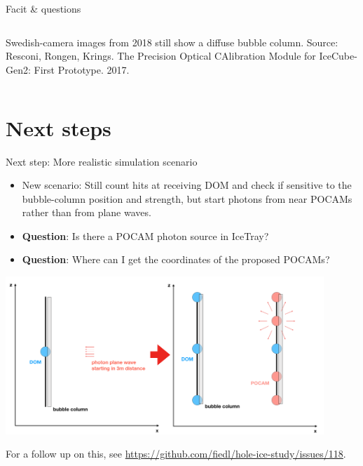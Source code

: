 \begin{frame}[fragile]{Facit \& questions}
\begin{columns}
\begin{column}{0.5\textwidth}
      \vspace*{4mm}
      \tiny Swedish-camera images from 2018 still show a diffuse bubble column. Source: Resconi, Rongen, Krings. The Precision Optical CAlibration Module for IceCube-Gen2: First Prototype. 2017.
    \end{column}
  \end{columns}
\end{frame}

\section{Next steps}
\begin{frame}[fragile]{Next step: More realistic simulation scenario}
  \begin{itemize}
    \item New scenario: Still count hits at receiving DOM and check if sensitive to the bubble-column position and strength, but start photons from near POCAMs rather than from plane waves.
    \item \textbf{Question}: Is there a POCAM photon source in IceTray?
    \item \textbf{Question}: Where can I get the coordinates of the proposed POCAMs?
  \end{itemize}
  \includegraphics[width=0.9\textwidth]{img/pocamscenario}

  \tiny For a follow up on this, see \url{https://github.com/fiedl/hole-ice-study/issues/118}.
\end{frame}

